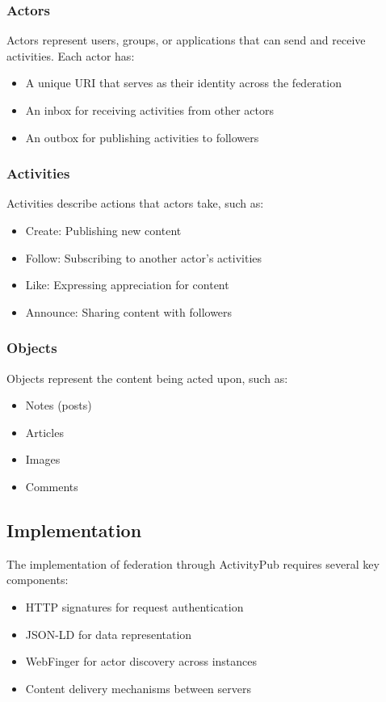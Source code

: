 \subsubsection{Actors}
Actors represent users, groups, or applications that can send and receive activities. Each actor has:
\begin{itemize}
    \item A unique URI that serves as their identity across the federation
    \item An inbox for receiving activities from other actors
    \item An outbox for publishing activities to followers
\end{itemize}

\subsubsection{Activities}
Activities describe actions that actors take, such as:
\begin{itemize}
    \item Create: Publishing new content
    \item Follow: Subscribing to another actor's activities
    \item Like: Expressing appreciation for content
    \item Announce: Sharing content with followers
\end{itemize}

\subsubsection{Objects}
Objects represent the content being acted upon, such as:
\begin{itemize}
    \item Notes (posts)
    \item Articles
    \item Images
    \item Comments
\end{itemize}

\subsection{Implementation}
The implementation of federation through ActivityPub requires several key components:
\begin{itemize}
    \item HTTP signatures for request authentication
    \item JSON-LD for data representation
    \item WebFinger for actor discovery across instances
    \item Content delivery mechanisms between servers
\end{itemize}

